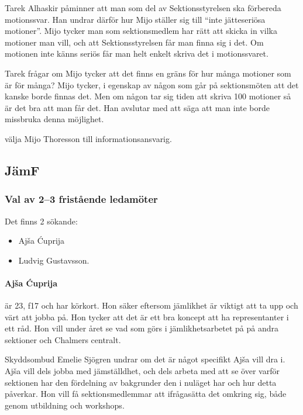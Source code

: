 \documentclass[hidelinks]{sektionsmote}
\begin{document}
Tarek Alhaskir påminner att man som del av Sektionsstyrelsen ska förbereda motionssvar.
Han undrar därför hur Mijo ställer sig till \enquote{inte jätteseriösa motioner}.
Mijo tycker man som sektionsmedlem har rätt att skicka in vilka motioner man vill, och att Sektionsstyrelsen får man finna sig i det.
Om motionen inte känns seriös får man helt enkelt skriva det i motionssvaret.

Tarek frågar om Mijo tycker att det finns en gräns för hur många motioner som är för många?
Mijo tycker, i egenskap av någon som går på sektionsmöten att det kanske borde finnas det.
Men om någon tar sig tiden att skriva 100 motioner så är det bra att man får det.
Han avslutar med att säga att man inte borde missbruka denna möjlighet.

\begin{beslut}
  \item välja Mijo Thoresson till informationsansvarig.
\end{beslut}

\subsection{JämF}

\subsubsection{Val av 2--3 fristående ledamöter}
Det finns 2 sökande:
\begin{itemize}
    \item Ajša Ćuprija
    \item Ludvig Gustavsson.
\end{itemize}

\paragraph{Ajša Ćuprija} är 23, f17 och har körkort.
Hon säker eftersom jämlikhet är viktigt att ta upp och värt att jobba på.
Hon tycker att det är ett bra koncept att ha representanter i ett råd.
Hon vill under året se vad som görs i jämlikhetsarbetet på på andra sektioner och Chalmers centralt.

Skyddsombud Emelie Sjögren undrar om det är något specifikt Ajša vill dra i.
Ajša vill dels jobba med jämställdhet, och dels arbeta med att se över varför sektionen har den fördelning av bakgrunder den i nuläget har och hur detta påverkar.
Hon vill få sektionsmedlemmar att ifrågasätta det omkring sig, både genom utbildning och workshops.
\end{document}
